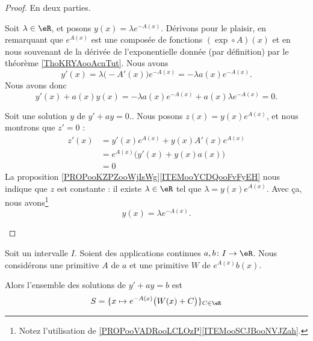 \begin{proof}
	En deux parties.
	\begin{subproof}
		Soit \( \lambda\in \eR\), et posons \( y(x)=\lambda e^{-A(x)}\). Dérivons pour le plaisir, en remarquant que \( e^{A(x)}\) est une composée de fonctions \( (\exp\circ A)(x)\) et en nous souvenant de la dérivée de l'exponentielle donnée (par définition) par le théorème \ref{ThoKRYAooAcnTut}. Nous avons
		\begin{equation}
			y'(x)=\lambda\big( -A'(x) \big)e^{-A(x)}=-\lambda a(x)e^{-A(x)}.
		\end{equation}
		Nous avons donc
		\begin{equation}
			y'(x)+a(x)y(x)=-\lambda a(x)e^{-A(x)}+a(x)\lambda e^{-A(x)}=0.
		\end{equation}

		Soit une solution \( y\) de \( y'+ay=0.\). Nous posons \( z(x)=y(x)e^{A(x)}\), et nous montrons que \( z'=0\) :
		\begin{subequations}
			\begin{align}
				z'(x) & =y'(x)e^{A(x)}+y(x)A'(x)e^{A(x)}    \\
				      & =e^{A(x)}\big( y'(x)+y(x)a(x) \big) \\
				      & =0
			\end{align}
		\end{subequations}
		La proposition \ref{PROPooKZPZooWjIsWg}\ref{ITEMooYCDQooFvFyEH} nous indique que \( z\) est constante : il existe \( \lambda\in \eR\) tel que \( \lambda=y(x)e^{A(x)}\). Avec ça, nous avons\footnote{Notez l'utilisation de \ref{PROPooVADRooLCLOzP}\ref{ITEMooSCJBooNVJZah}.}
		\begin{equation}
			y(x)=\lambda e^{-A(x)}.
		\end{equation}
	\end{subproof}
\end{proof}

\begin{proposition}     \label{PROPooZCXQooPQpkdQ}
	Soit un intervalle \( I\). Soient des applications continues \(a,b \colon I\to \eR  \). Nous considérons une primitive \( A\) de \( a\) et une primitive \( W\) de \( e^{A(x)}b(x)\).

	Alors l'ensemble des solutions de \( y'+ay=b\) est
	\begin{equation}
		S=\{ x\mapsto e^{-A(x)}\big( W(x)+C \big) \}_{C\in \eR}
	\end{equation}
\end{proposition}


